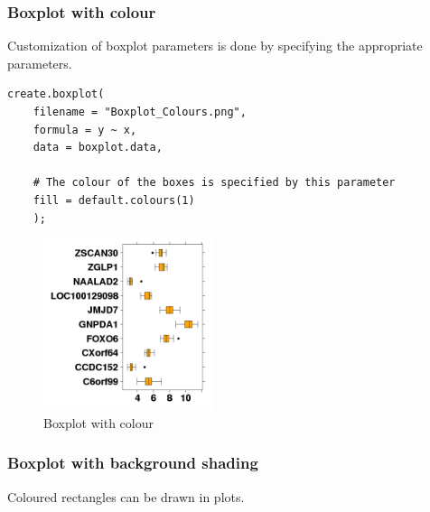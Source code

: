 \documentclass[letterpaper]{article}
\begin{document}
\subsubsection{Boxplot with colour}
Customization of boxplot parameters is done by specifying the appropriate parameters.
\begin{verbatim}
create.boxplot(
    filename = "Boxplot_Colours.png",
    formula = y ~ x, 
    data = boxplot.data,

    # The colour of the boxes is specified by this parameter
    fill = default.colours(1)
    );
\end{verbatim}
\begin{figure}[!ht]
  \begin{center}
     \includegraphics[width=50mm]{Figures/Boxplot_Colours.png}
     \caption{Boxplot with colour}
  \end{center}
\end{figure}

\subsubsection{Boxplot with background shading}
Coloured rectangles can be drawn in plots.
\end{document}
